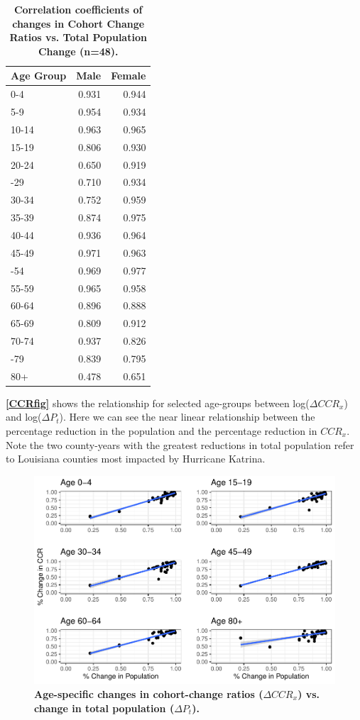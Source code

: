 \documentclass[12pt]{article}
\begin{document}
\begin{table}

\caption{\label{tab:correltable}\textbf{Correlation coefficients of changes in Cohort Change Ratios vs. Total Population Change (n=48).}}
\centering
\begin{tabular}[t]{lrr}
\toprule
Age Group & Male & Female\\
\midrule
0-4 & 0.931 & 0.944\\
5-9 & 0.954 & 0.934\\
10-14 & 0.963 & 0.965\\
15-19 & 0.806 & 0.930\\
20-24 & 0.650 & 0.919\\
\addlinespace
25-29 & 0.710 & 0.934\\
30-34 & 0.752 & 0.959\\
35-39 & 0.874 & 0.975\\
40-44 & 0.936 & 0.964\\
45-49 & 0.971 & 0.963\\
\addlinespace
50-54 & 0.969 & 0.977\\
55-59 & 0.965 & 0.958\\
60-64 & 0.896 & 0.888\\
65-69 & 0.809 & 0.912\\
70-74 & 0.937 & 0.826\\
\addlinespace
75-79 & 0.839 & 0.795\\
80+ & 0.478 & 0.651\\
\bottomrule
\end{tabular}
\end{table}

\textbf{\autoref{CCRfig}} shows the relationship for selected age-groups
between log(\(\Delta CCR_x\)) and log(\(\Delta P_t\)). Here we can see
the near linear relationship between the percentage reduction in the
population and the percentage reduction in \(CCR_x\). Note the two
county-years with the greatest reductions in total population refer to
Louisiana counties most impacted by Hurricane Katrina.

\begin{figure}
\centering
\includegraphics{manuscript_files/figure-latex/CCRfig-1.pdf}
\caption{\textbf{Age-specific changes in cohort-change ratios ($\Delta CCR_x$) vs. change in total population ($\Delta P_t$).}
\label{CCRfig}}
\end{figure}
\end{document}
